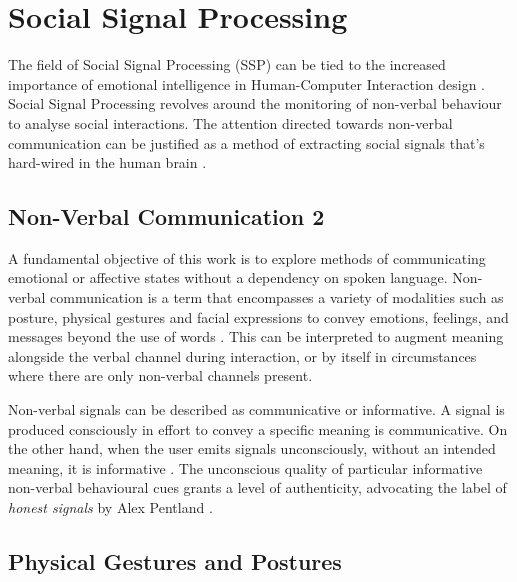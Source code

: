 \section{Social Signal Processing}

The field of Social Signal Processing (SSP) can be tied to the increased importance of emotional intelligence in Human-Computer Interaction design \cite{cristescu_emotions_2008}. Social Signal Processing revolves around the monitoring of non-verbal behaviour to analyse social interactions. The attention directed towards non-verbal communication can be justified as a method of extracting social signals that's hard-wired in the human brain \cite{vinciarelli_social_2009-1}. 

\subsection{Non-Verbal Communication 2}

A fundamental objective of this work is to explore methods of communicating emotional or affective states without a dependency on spoken language. Non-verbal communication is a term that encompasses a variety of modalities such as posture, physical gestures and facial expressions to convey emotions, feelings, and messages beyond the use of words \cite{knapp_nonverbal_2009, richmond_nonverbal_2011}. This can be interpreted to augment meaning alongside the verbal channel during interaction, or by itself in circumstances where there are only non-verbal channels present. 

Non-verbal signals can be described as communicative or informative. A signal is produced consciously in effort to convey a specific meaning is communicative. On the other hand, when the user emits signals unconsciously, without an intended meaning, it is informative \cite{vinciarelli_towards_2011}. The unconscious quality of particular informative non-verbal behavioural cues grants a level of authenticity, advocating the label of \textit{honest signals} by Alex Pentland \cite{pentland_honest_2010}.

\subsection{Physical Gestures and Postures}

